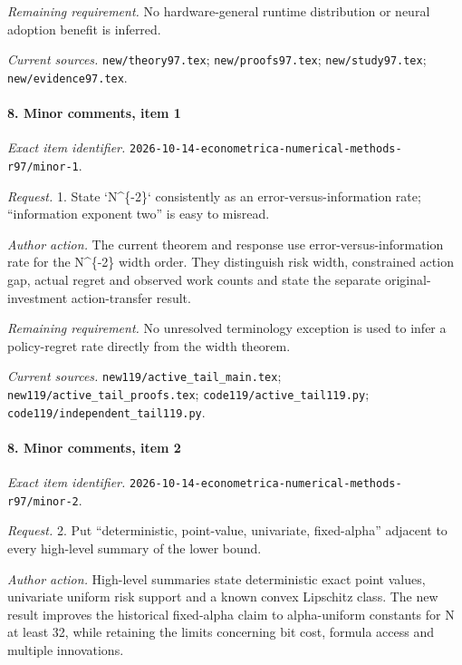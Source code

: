 \par\emph{Remaining requirement.} No hardware-general runtime distribution or neural adoption benefit is inferred.

\par\emph{Current sources.} \nolinkurl{new/theory97.tex}; \nolinkurl{new/proofs97.tex}; \nolinkurl{new/study97.tex}; \nolinkurl{new/evidence97.tex}.

\paragraph{8. Minor comments, item 1}

\emph{Exact item identifier.} \nolinkurl{2026-10-14-econometrica-numerical-methods-r97/minor-1}.

\par\emph{Request.} 1. State `N\textasciicircum{}\{-2\}` consistently as an error-versus-information rate; “information exponent two” is easy to misread.

\par\emph{Author action.} The current theorem and response use error-versus-information rate for the N\textasciicircum{}\{-2\} width order. They distinguish risk width, constrained action gap, actual regret and observed work counts and state the separate original-investment action-transfer result.

\par\emph{Remaining requirement.} No unresolved terminology exception is used to infer a policy-regret rate directly from the width theorem.

\par\emph{Current sources.} \nolinkurl{new119/active_tail_main.tex}; \nolinkurl{new119/active_tail_proofs.tex}; \nolinkurl{code119/active_tail119.py}; \nolinkurl{code119/independent_tail119.py}.

\paragraph{8. Minor comments, item 2}

\emph{Exact item identifier.} \nolinkurl{2026-10-14-econometrica-numerical-methods-r97/minor-2}.

\par\emph{Request.} 2. Put “deterministic, point-value, univariate, fixed-alpha” adjacent to every high-level summary of the lower bound.

\par\emph{Author action.} High-level summaries state deterministic exact point values, univariate uniform risk support and a known convex Lipschitz class. The new result improves the historical fixed-alpha claim to alpha-uniform constants for N at least 32, while retaining the limits concerning bit cost, formula access and multiple innovations.

